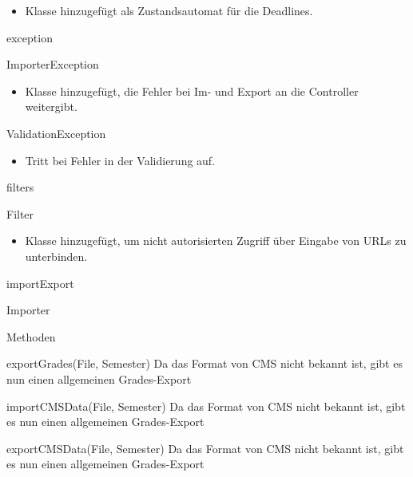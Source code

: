 \documentclass[parskip=full]{scrartcl}
\newcommand{\changeDescription}[1]{{\newline\color{black}\normalfont #1}}
\newcommand{\code}[1]{{\ttfamily #1}}
\begin{document}
\begin{itemPackage}
\begin{itemClass}
	\begin{itemize}
	  \item Klasse hinzugefügt als Zustandsautomat für die Deadlines. 
	\end{itemize}
	\end{itemClass}
\item exception
\begin{itemClass}
\item ImporterException 
\begin{itemize}
	  \item Klasse hinzugefügt, die Fehler bei Im- und Export an die Controller
	  weitergibt.
	\end{itemize}
	\item ValidationException
\begin{itemize}
  \item Tritt bei Fehler in der Validierung auf.
\end{itemize}
\end{itemClass}
\item filters
\begin{itemClass}
\item Filter
\begin{itemize}
	  \item Klasse hinzugefügt, um nicht autorisierten Zugriff über Eingabe von URLs
	  zu unterbinden.
	\end{itemize}
\end{itemClass}
\item importExport
\begin{itemClass}
\item Importer
\begin{itemClassSub}
\item Methoden
\begin{itemPlus}
\item exportGrades(File, Semester) \changeDescription{Da das Format von CMS
nicht bekannt ist, gibt es nun einen allgemeinen \code{Grades}-Export}
\end{itemPlus}
\begin{itemMinus}
\item importCMSData(File, Semester) \changeDescription{Da das Format von CMS
nicht bekannt ist, gibt es nun einen allgemeinen \code{Grades}-Export}
\item exportCMSData(File, Semester) \changeDescription{Da das Format von CMS
nicht bekannt ist, gibt es nun einen allgemeinen \code{Grades}-Export}
\end{itemMinus}
\end{itemClassSub}

\end{itemClass}
\end{itemPackage}
\end{document}
